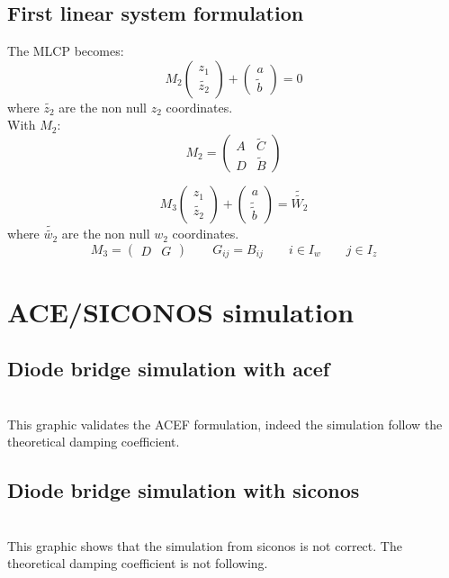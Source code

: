 \subsection{First linear system formulation}
The MLCP becomes:\\
\[\label{system2} M_{2} \left(\begin{array}{c} z_{1}\\ \widetilde{z_{2}}
\end{array}\right)+\left(\begin{array}{c} a\\ \widetilde{b}\end{array}\right)=0 \]
where $\widetilde{z_{2}}$ are the non null $z_{2}$ coordinates.\\
With $M_{2}$:
\[M_{2}=\left(\begin{array}{cc} A&\widetilde{C}\\D&\widetilde{B} \end{array}\right)\]

\[\label{system3} M_{3} \left(\begin{array}{c} z_{1}\\ \widetilde{z_{2}}
\end{array}\right)+\left(\begin{array}{c} a\\ \widetilde{\widetilde{b}}\end{array}\right)=\widetilde{\widetilde{W_{2}}} \]
where $\widetilde{\widetilde{w_{2}}}$ are the non null $w_{2}$ coordinates.
\[M_{3}=\left(\begin{array}{cc} D&G \end{array}\right)\qquad G_{ij}=B_{ij} \qquad i \in I_{w} \qquad
j \in I_{z}\]

\section{ACE/SICONOS simulation}

\subsection{Diode bridge simulation with acef}

\\
This graphic validates the ACEF formulation, indeed the simulation follow the theoretical damping coefficient.
\subsection{Diode bridge simulation with siconos}

\\
This graphic shows that the simulation from siconos is not correct. The theoretical damping
coefficient is not following.
